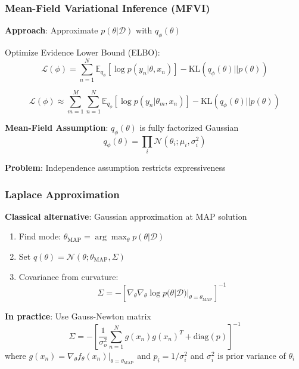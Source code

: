 \documentclass[aspectratio=169, 12pt]{beamer}
\begin{document}
\begin{frame}
\frametitle{Mean-Field Variational Inference (MFVI)}
\textbf{Approach}: Approximate $p(\theta|\mathcal{D})$ with $q_{\phi}(\theta)$

\vspace{0.3cm}
Optimize Evidence Lower Bound (ELBO):
$$\mathcal{L}(\phi) = \sum_{n=1}^{N} \mathbb{E}_{q_{\phi}}[\log p(y_n|\theta, x_n)] - \text{KL}(q_{\phi}(\theta)||p(\theta))$$

$$\mathcal{L}(\phi) \approx \sum_{m=1}^M\sum_{n=1}^{N} \mathbb{E}_{q_{\phi}}[\log p(y_n|\theta_m, x_n)] - \text{KL}(q_{\phi}(\theta)||p(\theta))$$

\vspace{0.3cm}
\textbf{Mean-Field Assumption}: $q_{\phi}(\theta)$ is fully factorized Gaussian
$$q_{\phi}(\theta) = \prod_i \mathcal{N}(\theta_i; \mu_i, \sigma_i^2)$$

\textbf{Problem}: Independence assumption restricts expressiveness
\end{frame}


\begin{frame}
\frametitle{Laplace Approximation}
\textbf{Classical alternative}: Gaussian approximation at MAP solution

\vspace{0.3cm}
\begin{enumerate}
\item Find mode: $\theta_{\text{MAP}} = \arg\max_{\theta} p(\theta|\mathcal{D})$
\item Set $q(\theta) = \mathcal{N}(\theta; \theta_{\text{MAP}}, \Sigma)$
\item Covariance from curvature:
$$\Sigma = -\left[\nabla_{\theta}\nabla_{\theta} \log p(\theta|\mathcal{D})|_{\theta=\theta_{\text{MAP}}}\right]^{-1}$$
\end{enumerate}

\vspace{0.3cm}
\textbf{In practice}: Use Gauss-Newton matrix
$$\Sigma = -\left[\frac{1}{\sigma_o^2}\sum_{n=1}^{N} g(x_n)g(x_n)^T + \text{diag}(p)\right]^{-1}$$
where $g(x_n) = \nabla_{\theta} f_{\theta}(x_n)|_{\theta=\theta_{\text{MAP}}}$ and $p_i = 1/\sigma_i^2$ and $\sigma_i^2$ is prior variance of $\theta_i$
\end{frame}
\end{document}
